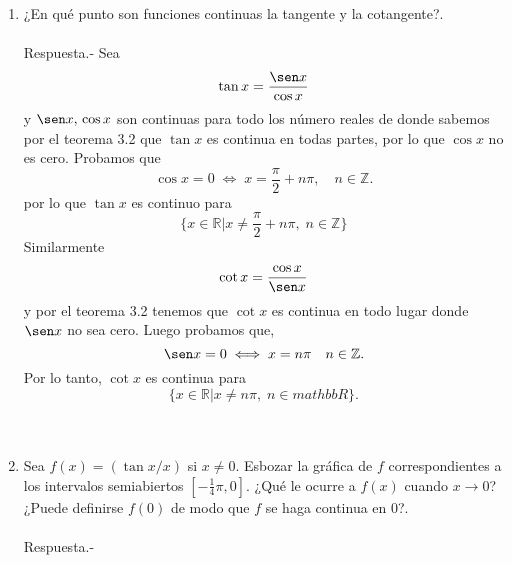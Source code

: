 \begin{enumerate}[\bfseries 1.]
    \item ¿En qué punto son funciones continuas la tangente y la cotangente?.\\\\
	Respuesta.-\; Sea $$\tan x = \dfrac{\sen x}{\cos x}$$
	y $\sen x,\, \cos x$ son continuas para todo los número reales de donde sabemos por el teorema 3.2 que $\tan x$ es continua en todas partes, por lo que $\cos x$ no es cero. Probamos que 
	$$\cos x=0 \; \Longleftrightarrow \; x=\dfrac{\pi}{2}+n\pi,\quad n\in \mathbb{Z}.$$
	por lo que $\tan x$ es continuo para 
	$$\lbrace x\in \mathbb{R} | x\neq \dfrac{\pi}{2}+n\pi,\; n\in \mathbb{Z} \rbrace$$
	Similarmente 
	$$\cot x = \dfrac{\cos x}{\sen x}$$
	 y por el teorema 3.2 tenemos que $\cot x$ es continua en todo lugar donde $\sen x$ no sea cero. Luego probamos que,
	 $$\sen x = 0\; \Longleftrightarrow \; x=n\pi \quad n  \in \mathbb{Z}.$$
	 Por lo tanto, $\cot x$ es continua para 
	 $$\lbrace x\in \mathbb{R} | x\neq n\pi, \; n \in mathbb{R}\rbrace.$$\\\\

    \item Sea $f(x)=(\tan x/x)$ si $x\neq 0$. Esbozar la gráfica de $f$ correspondientes a los intervalos semiabiertos $[-\frac{1}{4}\pi,0]$. ¿Qué le ocurre a $f(x)$ cuando $x\to 0$? ¿Puede definirse $f(0)$ de modo que $f$ se haga continua en $0$?.\\\\
	Respuesta.-\; 
	    \begin{center}
	    \end{center}
	    \vspace{.5cm}


\end{enumerate}
